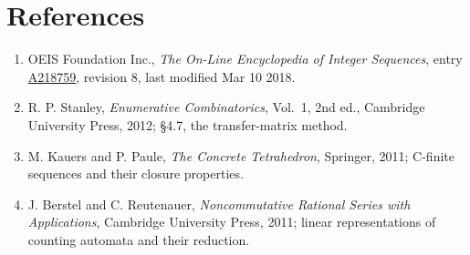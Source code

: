 \documentclass[11pt]{article}
\theoremstyle{definition}
\begin{document}
\section{References}

\begin{enumerate}

\item OEIS Foundation Inc., \emph{The On-Line Encyclopedia of Integer Sequences}, entry \href{https://oeis.org/A218759}{A218759}, revision 8, last modified Mar 10 2018.

\item R. P. Stanley, \emph{Enumerative Combinatorics}, Vol.~1, 2nd ed., Cambridge University Press, 2012; \S4.7, the transfer-matrix method.

\item M. Kauers and P. Paule, \emph{The Concrete Tetrahedron}, Springer, 2011; C-finite sequences and their closure properties.

\item J. Berstel and C. Reutenauer, \emph{Noncommutative Rational Series with Applications}, Cambridge University Press, 2011; linear representations of counting automata and their reduction.

\end{enumerate}
\end{document}
